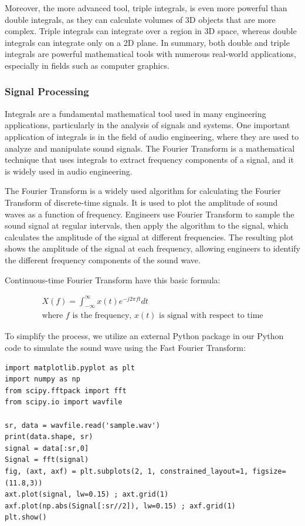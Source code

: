 \documentclass[13pt,a4paper]{report}
\begin{document}
Moreover, the more advanced tool, triple integrals, is even more powerful than double integrals, as they can calculate volumes of 3D objects that are more complex. Triple integrals can integrate over a region in 3D space, whereas double integrals can integrate only on a 2D plane. In summary, both double and triple integrals are powerful mathematical tools with numerous real-world applications, especially in fields such as computer graphics.





\subsubsection{Signal Processing}

Integrals are a fundamental mathematical tool used in many engineering applications, particularly in the analysis of signals and systems. One important application of integrals is in the field of audio engineering, where they are used to analyze and manipulate sound signals. The Fourier Transform is a mathematical technique that uses integrals to extract frequency components of a signal, and it is widely used in audio engineering.

The Fourier Transform is a widely used algorithm for calculating the Fourier Transform of discrete-time signals. It is used to plot the amplitude of sound waves as a function of frequency. Engineers use Fourier Transform to sample the sound signal at regular intervals, then apply the algorithm to the signal, which calculates the amplitude of the signal at different frequencies. The resulting plot shows the amplitude of the signal at each frequency, allowing engineers to identify the different frequency components of the sound wave.

Continuous-time Fourier Transform have this basic formula:

\begin{gather*}
X(f)=\int_{-\infty}^{\infty} x(t)e^{-j2\pi ft} dt\\
\text{where } f \text{ is the frequency, } x(t) \text{ is signal with respect to time}
\end{gather*}

To simplify the process, we utilize an external Python package in our Python code to simulate the sound wave using the Fast Fourier Transform:\\[-0.3cm]

\begin{verbatim}
import matplotlib.pyplot as plt
import numpy as np
from scipy.fftpack import fft
from scipy.io import wavfile

sr, data = wavfile.read('sample.wav')
print(data.shape, sr)
signal = data[:sr,0]
Signal = fft(signal)
fig, (axt, axf) = plt.subplots(2, 1, constrained_layout=1, figsize=(11.8,3))
axt.plot(signal, lw=0.15) ; axt.grid(1)
axf.plot(np.abs(Signal[:sr//2]), lw=0.15) ; axf.grid(1)
plt.show()
\end{verbatim}
\end{document}
